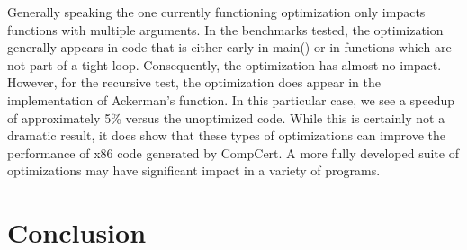 \documentclass{article}
\begin{document}
Generally speaking the one currently functioning optimization only
impacts functions with multiple arguments. In the benchmarks tested,
the optimization generally appears in code that is either early in
main() or in functions which are not part of a tight
loop. Consequently, the optimization has almost no impact. However,
for the recursive test, the optimization does appear in the
implementation of Ackerman's function. In this particular case, we see
a speedup of approximately 5\% versus the unoptimized code. While this
is certainly not a dramatic result, it does show that these types of
optimizations can improve the performance of x86 code generated by
CompCert. A more fully developed suite of optimizations may have
significant impact in a variety of programs. 

\section{Conclusion}
\end{document}
